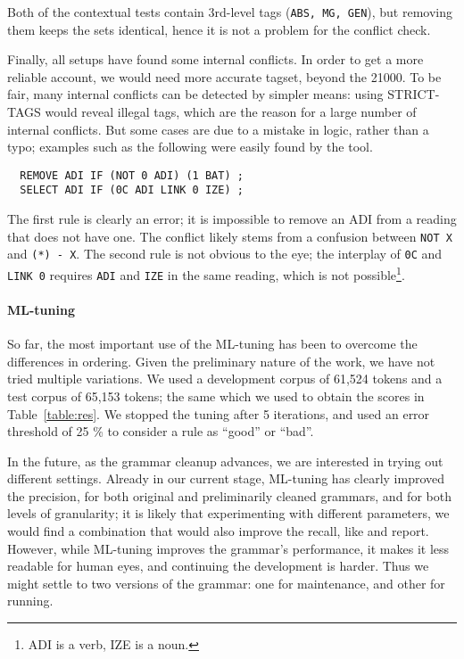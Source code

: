 \documentclass[11pt]{article}
\begin{document}
\noindent Both of the contextual tests contain 3rd-level tags (\texttt{ABS, MG, GEN}), but removing them keeps the sets identical, hence it is not a problem for the conflict check.



Finally, all setups have found some internal conflicts. In order to get a more reliable account, we would need 
more accurate tagset, beyond the 21000. To be fair, many internal conflicts can be detected by simpler means:
using STRICT-TAGS would reveal illegal tags, which are the reason for a large number of internal conflicts. 
But some cases are due to a mistake in logic, rather than a typo; examples such as the following were easily found by the tool. %

\begin{verbatim}
  REMOVE ADI IF (NOT 0 ADI) (1 BAT) ;
  SELECT ADI IF (0C ADI LINK 0 IZE) ;
\end{verbatim}

\noindent The first rule is clearly an error; it is impossible to remove an ADI from a reading that does not have one.
The conflict likely stems from a confusion between \texttt{NOT X} and \texttt{(*) - X}.
The second rule is not obvious to the eye; the interplay of \texttt{0C} and \texttt{LINK 0} requires 
\texttt{ADI} and \texttt{IZE} in the same reading, which is not possible\footnote{ADI is a verb, IZE is a noun.}.


\paragraph{ML-tuning}

So far, the most important use of the ML-tuning has been to overcome
the differences in ordering. 
Given the preliminary nature of the work, we have not tried multiple
variations. We used a development corpus of 61,524
tokens and a test corpus of 65,153 tokens; the same which we used to
obtain the scores in Table~\ref{table:res}. We stopped the tuning
after 5 iterations, and used an error threshold of 25 \% to consider a
rule as ``good'' or ``bad''. 

In the future, as the grammar cleanup advances, we are interested in
trying out different settings.
Already in our current stage, ML-tuning has clearly
improved the precision, for both original and preliminarily cleaned
grammars, and for both levels of granularity; it is likely that
experimenting with different parameters, we would find a combination
that would also improve the recall, like  
and  report.
However, while ML-tuning improves the grammar's performance, it makes
it less readable for human eyes, and continuing the development is
harder. Thus we might settle to two versions of the grammar: one for
maintenance, and other for running.
\end{document}
